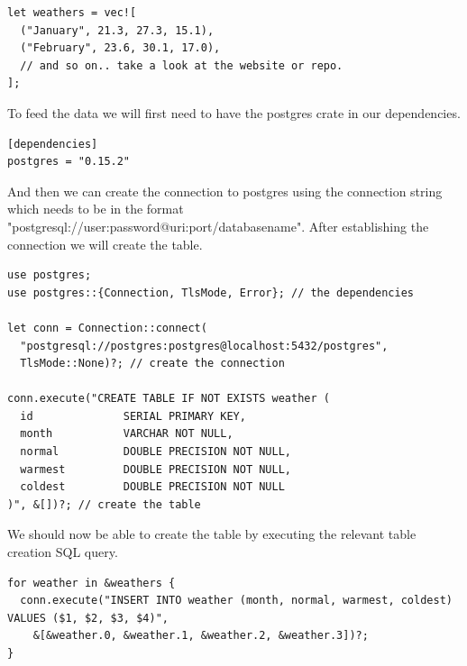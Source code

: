 \documentclass{book}
\begin{document}
\begin{lstlisting}[caption={chapter4\\/working\_with\_data\\/databases\\/src\\/main\\.rs},basicstyle=\small]
let weathers = vec![
  ("January", 21.3, 27.3, 15.1),
  ("February", 23.6, 30.1, 17.0),
  // and so on.. take a look at the website or repo.
];
\end{lstlisting}

To feed the data we will first need to have the postgres crate in our dependencies.

\begin{lstlisting}[caption={chapter4\\/working\_with\_data\\/databases\\/Cargo\\.toml},basicstyle=\small]
[dependencies]
postgres = "0.15.2"
\end{lstlisting}

And then we can create the connection to postgres using the connection string which needs to be in the format "postgresql://user:password@uri:port/databasename". After establishing the connection we will create the table.

\begin{lstlisting}[caption={chapter4\\/working\_with\_data\\/databases\\/src\\/main\\.rs},basicstyle=\small]
use postgres;
use postgres::{Connection, TlsMode, Error}; // the dependencies

let conn = Connection::connect(
  "postgresql://postgres:postgres@localhost:5432/postgres",
  TlsMode::None)?; // create the connection

conn.execute("CREATE TABLE IF NOT EXISTS weather (
  id              SERIAL PRIMARY KEY,
  month           VARCHAR NOT NULL,
  normal          DOUBLE PRECISION NOT NULL,
  warmest         DOUBLE PRECISION NOT NULL,
  coldest         DOUBLE PRECISION NOT NULL
)", &[])?; // create the table
\end{lstlisting}

We should now be able to create the table by executing the relevant table creation SQL query.

\begin{lstlisting}[caption={chapter4\\/working\_with\_data\\/databases\\/src\\/main\\.rs},basicstyle=\small]
for weather in &weathers {
  conn.execute("INSERT INTO weather (month, normal, warmest, coldest) VALUES ($1, $2, $3, $4)",
    &[&weather.0, &weather.1, &weather.2, &weather.3])?;
}
\end{lstlisting}
\end{document}

